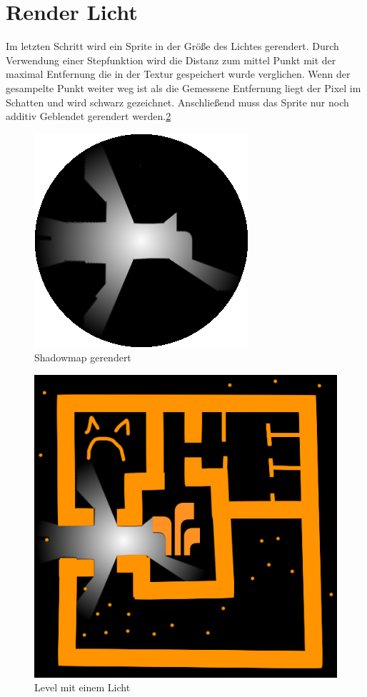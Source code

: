 \section{Render Licht}
Im letzten Schritt wird ein Sprite in der Größe des Lichtes gerendert. Durch Verwendung einer Stepfunktion wird die Distanz zum mittel Punkt mit der maximal Entfernung die in der Textur gespeichert wurde verglichen. Wenn der gesampelte Punkt weiter weg ist als die Gemessene Entfernung liegt der Pixel im Schatten und wird schwarz gezeichnet.
Anschließend muss das Sprite nur noch additiv Geblendet gerendert werden.\ref{level_licht_1}
\begin{figure}
	\centering
	\includegraphics{images/shadow_shadow_2.png}
	\caption{Shadowmap gerendert}
	\label{shadows_1}
\end{figure}
\begin{figure}
	\centering
	\includegraphics[scale=0.75]{images/final.png}
	\caption{Level mit einem Licht}
	\label{level_licht_1}
\end{figure}